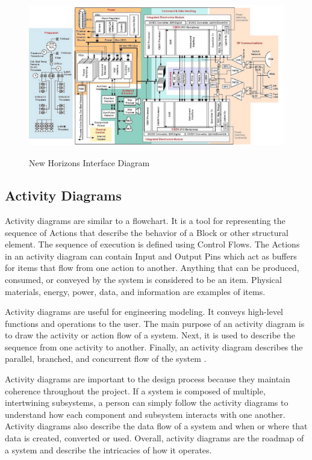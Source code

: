 \documentclass{article}
\begin{document}
\begin{figure}[H]
  \begin{center}
  \includegraphics[height=70mm]{Figures/NewHorizons_ID}
  \end{center}
  \caption{New Horizons Interface Diagram\cite{qp11}}
\end{figure}
\subsection{Activity Diagrams}
Activity diagrams are similar to a flowchart.  It is a tool for
representing the sequence of Actions that describe the behavior of a
Block or other structural element. The sequence of execution is
defined using Control Flows. The Actions in an activity diagram can
contain Input and Output Pins which act as buffers for items that flow
from one action to another. Anything that can be produced, consumed,
or conveyed by the system is considered to be an item. Physical
materials, energy, power, data, and information are examples of items\cite{qp12}.

Activity diagrams are useful for engineering modeling.  It conveys
high-level functions and operations to the user. The main purpose of
an activity diagram is to draw the activity or action flow of a
system. Next, it is used to describe the sequence from one activity to
another. Finally, an activity diagram describes the parallel,
branched, and concurrent flow of the system \cite{qp13}.

Activity diagrams are important to the design process because they
maintain coherence throughout the project. If a system is composed of
multiple, intertwining subsystems, a person can simply follow the
activity diagrams to understand how each component and subsystem
interacts with one another. Activity diagrams also describe the data
flow of a system and when or where that data is created, converted or
used. Overall, activity diagrams are the roadmap of a system and
describe the intricacies of how it operates.  
\end{document}
